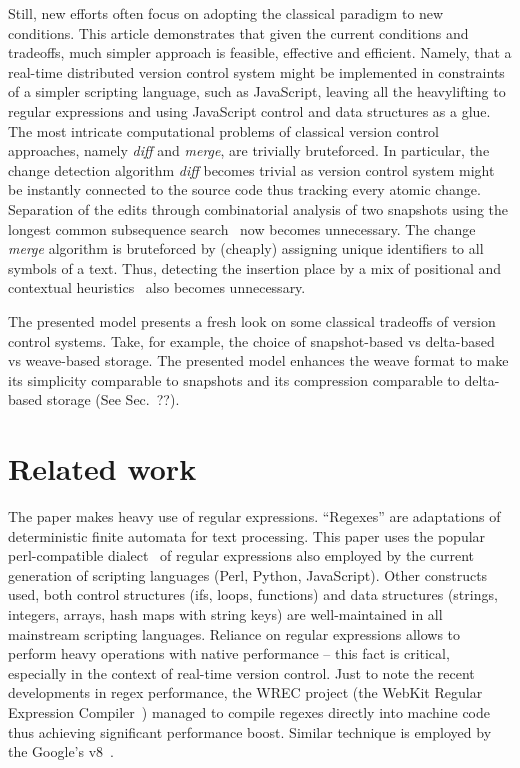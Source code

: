 \documentclass[twocolumn]{article}
\begin{document}
Still, new efforts often focus on adopting the classical paradigm to new conditions. This article demonstrates that given the current conditions and tradeoffs, much simpler approach is feasible, effective and efficient.
Namely, that a real-time distributed version control system might be implemented in constraints of a simpler scripting language, such as JavaScript, leaving all the heavylifting to regular expressions and using JavaScript control and data structures as a glue.
The most intricate computational problems of classical version control  approaches, namely \emph{diff} and \emph{merge}, are trivially bruteforced. In particular, the change detection algorithm \emph{diff} becomes trivial as version control system might be instantly connected to the source code thus tracking every atomic change. Separation of the edits through combinatorial analysis of two snapshots using the longest common subsequence search~\cite{diff} now becomes unnecessary. The change \emph{merge} algorithm is bruteforced by (cheaply) assigning unique identifiers to all symbols of a text. Thus, detecting the insertion place by a mix of positional and contextual heuristics~\cite{fraser} also becomes unnecessary.

The presented model presents a fresh look on some classical tradeoffs of version control systems. Take, for example, the choice of snapshot-based vs delta-based vs weave-based storage. The presented model enhances the weave format to make its simplicity comparable to snapshots and its compression comparable to delta-based storage (See Sec.~??).


\section{Related work}

The paper makes heavy use of regular expressions. ``Regexes'' are adaptations of deterministic finite automata for text processing. This paper uses the popular perl-compatible dialect~\cite{pcre} of regular expressions also employed by the current generation of scripting languages (Perl, Python, JavaScript). Other constructs used, both control structures (ifs, loops, functions) and data structures (strings, integers, arrays, hash maps with string keys) are well-maintained in all mainstream scripting languages. Reliance on regular expressions allows to perform heavy operations with native performance -- this fact is critical, especially in the context of real-time version control.
Just to note the recent developments in regex performance, the WREC project (the WebKit Regular Expression Compiler~\cite{wrec}) managed to compile regexes directly into machine code thus achieving significant performance boost. Similar technique is employed by the Google's v8~\cite{v8-change-log}.
\end{document}
